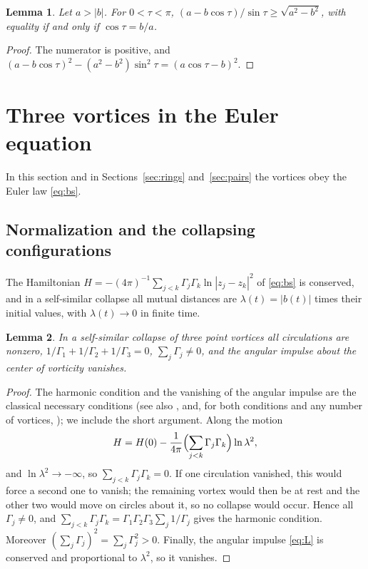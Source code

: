 \documentclass[11pt]{article}
\newtheorem{lemma}{Lemma}
\theoremstyle{definition}
\begin{document}
\begin{lemma}\label{lem:ineq}
Let $a > |b|$. For $0 < \tau < \pi$, $(a - b\cos\tau)/\sin\tau \ge \sqrt{a^2 - b^2}$, with equality if and only if $\cos\tau = b/a$.
\end{lemma}

\begin{proof}
The numerator is positive, and $(a - b\cos\tau)^2 - (a^2 - b^2)\sin^2\tau = (a\cos\tau - b)^2$.
\end{proof}

\section{Three vortices in the Euler equation}\label{sec:three}

In this section and in Sections~\ref{sec:rings} and~\ref{sec:pairs} the vortices obey the Euler law \eqref{eq:bs}.

\subsection{Normalization and the collapsing configurations}

The Hamiltonian $H = -(4\pi)^{-1} \sum_{j<k} \Gamma_j \Gamma_k \ln|z_j - z_k|^2$ of \eqref{eq:bs} is conserved, and in a self-similar collapse all mutual distances are $\lambda(t) = |b(t)|$ times their initial values, with $\lambda(t) \to 0$ in finite time.

\begin{lemma}\label{lem:necessary}
In a self-similar collapse of three point vortices all circulations are nonzero, $1/\Gamma_1 + 1/\Gamma_2 + 1/\Gamma_3 = 0$, $\sum_j \Gamma_j \ne 0$, and the angular impulse about the center of vorticity vanishes.
\end{lemma}

\begin{proof}
The harmonic condition and the vanishing of the angular impulse are the classical necessary conditions \cite[Sect.~II~B]{aref2010} (see also \cite[Eqs.~(3.20)--(3.21), (3.33)]{kimura1987}, \cite[Sect.~3]{bl1998} and, for both conditions and any number of vortices, \cite[Eqs.~(26)--(28)]{dk2014}); we include the short argument. Along the motion
\[
  H = H(0) - \frac{1}{4\pi} \Bigl(\sum_{j<k} \Gamma_j \Gamma_k\Bigr) \ln\lambda^2,
\]
and $\ln\lambda^2 \to -\infty$, so $\sum_{j<k} \Gamma_j \Gamma_k = 0$. If one circulation vanished, this would force a second one to vanish; the remaining vortex would then be at rest and the other two would move on circles about it, so no collapse would occur. Hence all $\Gamma_j \ne 0$, and $\sum_{j<k} \Gamma_j \Gamma_k = \Gamma_1\Gamma_2\Gamma_3 \sum_j 1/\Gamma_j$ gives the harmonic condition. Moreover $(\sum_j \Gamma_j)^2 = \sum_j \Gamma_j^2 > 0$. Finally, the angular impulse \eqref{eq:L} is conserved and proportional to $\lambda^2$, so it vanishes.
\end{proof}
\end{document}
